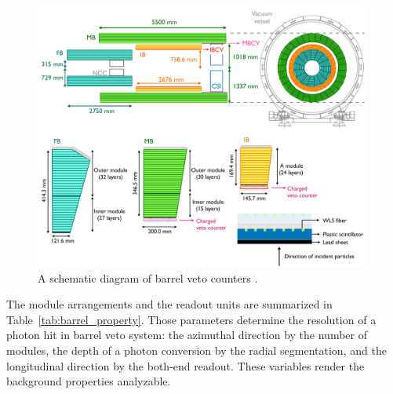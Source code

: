\begin{figure}[h]
\begin{center}
\captionsetup{width=.99\linewidth}
\includegraphics[width=0.99\textwidth]{Figures/Chapter3/Barrel_veto.pdf}
\caption{A schematic diagram of barrel veto counters \parencite{KOTO_intro, barrel_veto, IB}.}
\label{fig:barrel_config}
\end{center}
\end{figure}

The module arrangements and the readout units are summarized in Table~\ref{tab:barrel_property}. Those parameters determine the resolution of a photon hit in barrel veto system: the azimuthal direction by the number of modules, the depth of a photon conversion by the radial segmentation, and the longitudinal direction by the both-end readout. These variables render the background properties analyzable.

